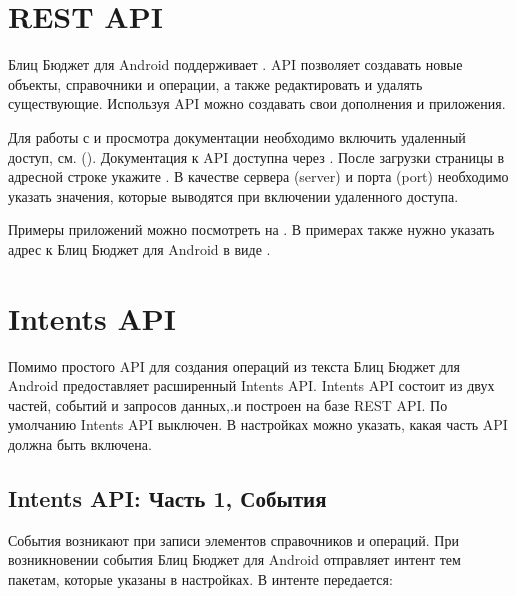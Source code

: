 \documentclass[a4paper,10pt,russian]{sphinxmanual}
\begin{document}
\section{REST API}
\label{\detokenize{api:rest-api}}\label{\detokenize{api:sub-chapter-rest-api}}
Блиц Бюджет для Android поддерживает . API позволяет создавать новые объекты, справочники и операции, а также редактировать и удалять существующие. Используя API
можно создавать свои дополнения и приложения.

Для работы с  и просмотра документации необходимо включить удаленный доступ, см. {\hyperref[\detokenize{remote-access:chapter-remote-access}]{}} ().
Документация к API доступна через . После загрузки страницы в адресной строке  укажите .
В качестве сервера (server) и порта (port) необходимо указать значения, которые выводятся при включении удаленного доступа.

Примеры приложений можно посмотреть на . В примерах также нужно указать адрес к Блиц Бюджет для Android в виде .


\section{Intents API}
\label{\detokenize{api:intents-api}}
Помимо простого API для создания операций из текста Блиц Бюджет для Android предоставляет расширенный Intents API.
Intents API  состоит из двух частей, событий и запросов данных,.и построен на базе REST API.
По умолчанию Intents API выключен. В настройках можно указать, какая часть API должна быть включена.


\subsection{Intents API: Часть 1, События}
\label{\detokenize{api:intents-api-1}}
События возникают при записи элементов справочников и операций. При возникновении события Блиц Бюджет для Android отправляет интент тем пакетам,
которые указаны в настройках. В интенте передается:
\end{document}
